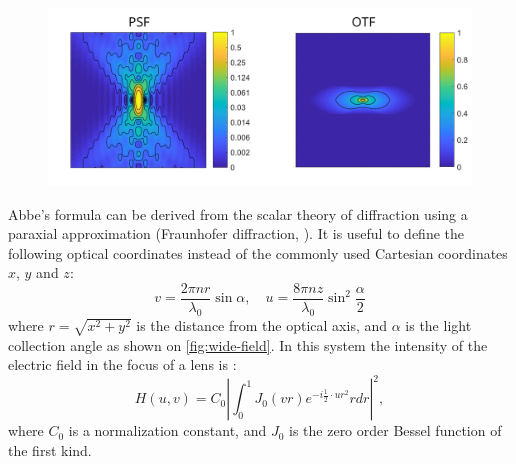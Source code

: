    \begin{figure}
      \centering
      \includegraphics[width=1\textwidth]{psfs/WF.pdf}
      \label{fig:psf-wf}
    \end{figure}


    Abbe's formula can be derived from the scalar theory of diffraction using a paraxial approximation (Fraunhofer diffraction, \cite{born_principles_2013}).     
    It is useful to define the following optical coordinates instead of the commonly used Cartesian coordinates $x$, $y$ and $z$:
    \begin{equation}
      v = \frac{2\pi n  r}{\lambda_0} \sin \alpha, \quad
      u=\frac{8\pi n  z}{\lambda_0} \sin^2 \frac{\alpha}{2}
      \label{eq:substitutions}
    \end{equation}
    where $r = \sqrt{x^2 + y^2}$ is the distance from the optical axis, and $\alpha$ is the light collection angle as shown on \autoref{fig:wide-field}. In this system the intensity of the electric field in the focus of a lens is \cite{sheppard_imaging_1987}:
    \begin{equation}
      H(u,v) = C_0 \left| \int_0^1 J_0 (vr)e^{-i\frac{1}{2}\cdot ur^2} rdr \right|^2,
      \label{eq:psf}
    \end{equation}
    where $C_0$ is a normalization constant, and $J_0$ is the zero order Bessel function of the first kind.
    
    


